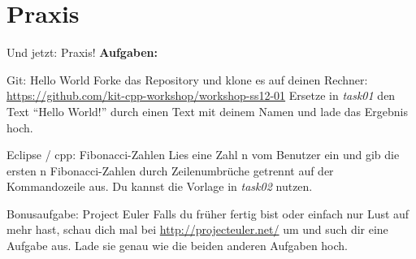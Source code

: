 \section{Praxis}
\begin{frame}{Und jetzt: Praxis!}
	\textbf{Aufgaben:}

	\begin{block}{Git: Hello World}
		Forke das Repository und klone es auf deinen Rechner:
		\url{https://github.com/kit-cpp-workshop/workshop-ss12-01}
		Ersetze in \emph{task01} den Text \enquote{Hello World!} durch einen Text mit deinem Namen und lade das Ergebnis hoch.
	\end{block}
	
	\begin{block}{Eclipse / cpp: Fibonacci-Zahlen}
		Lies eine Zahl n vom Benutzer ein und gib die ersten n Fibonacci-Zahlen durch Zeilenumbrüche getrennt auf der Kommandozeile aus. Du kannst die Vorlage in \emph{task02} nutzen.
	\end{block}
	
	\begin{block}{Bonusaufgabe: Project Euler}
		Falls du früher fertig bist oder einfach nur Lust auf mehr hast, schau dich mal bei \url{http://projecteuler.net/} um und such dir eine Aufgabe aus. Lade sie genau wie die beiden anderen Aufgaben hoch.
	\end{block}
\end{frame}
